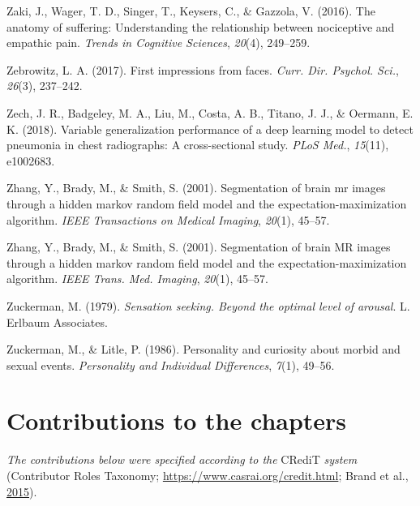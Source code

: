 \documentclass[11pt,american,]{memoir} %
\begin{document}
\leavevmode\hypertarget{ref-zaki2016anatomy}{}%
Zaki, J., Wager, T. D., Singer, T., Keysers, C., \& Gazzola, V. (2016). The anatomy of suffering: Understanding the relationship between nociceptive and empathic pain. \emph{Trends in Cognitive Sciences}, \emph{20}(4), 249--259.

\leavevmode\hypertarget{ref-Zebrowitz2017-qe}{}%
Zebrowitz, L. A. (2017). First impressions from faces. \emph{Curr. Dir. Psychol. Sci.}, \emph{26}(3), 237--242.

\leavevmode\hypertarget{ref-Zech2018-bq}{}%
Zech, J. R., Badgeley, M. A., Liu, M., Costa, A. B., Titano, J. J., \& Oermann, E. K. (2018). Variable generalization performance of a deep learning model to detect pneumonia in chest radiographs: A cross-sectional study. \emph{PLoS Med.}, \emph{15}(11), e1002683.

\leavevmode\hypertarget{ref-zhang2001segmentation}{}%
Zhang, Y., Brady, M., \& Smith, S. (2001). Segmentation of brain mr images through a hidden markov random field model and the expectation-maximization algorithm. \emph{IEEE Transactions on Medical Imaging}, \emph{20}(1), 45--57.

\leavevmode\hypertarget{ref-Zhang2001-wa}{}%
Zhang, Y., Brady, M., \& Smith, S. (2001). Segmentation of brain MR images through a hidden markov random field model and the expectation-maximization algorithm. \emph{IEEE Trans. Med. Imaging}, \emph{20}(1), 45--57.

\leavevmode\hypertarget{ref-zuckerman1979}{}%
Zuckerman, M. (1979). \emph{Sensation seeking. Beyond the optimal level of arousal}. L. Erlbaum Associates.

\leavevmode\hypertarget{ref-zuckerman1986personality}{}%
Zuckerman, M., \& Litle, P. (1986). Personality and curiosity about morbid and sexual events. \emph{Personality and Individual Differences}, \emph{7}(1), 49--56.

\endgroup

\hypertarget{contributions-to-the-chapters}{%
\chapter*{Contributions to the chapters}\label{contributions-to-the-chapters}}

\setlength{\parindent}{0pt}
\small

\emph{The contributions below were specified according to the} CRediT \emph{system} (Contributor Roles Taxonomy; \url{https://www.casrai.org/credit.html}; Brand et al., \protect\hyperlink{ref-brand2015beyond}{2015}).
\end{document}
